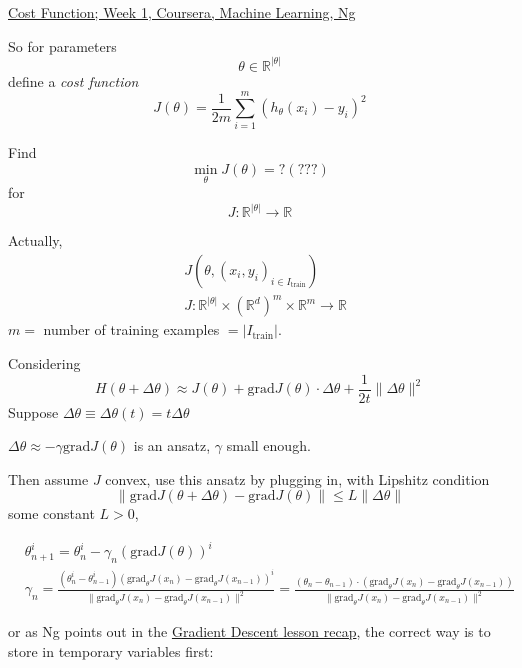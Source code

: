 \documentclass[10pt]{amsart}
\begin{document}
\begin{multicols*}{2}
\href{https://www.coursera.org/learn/machine-learning/lecture/rkTp3/cost-function}{Cost Function; Week 1, Coursera, Machine Learning, Ng}

So for parameters
\[
\theta \in \mathbb{R}^{ |\theta| }
\]
define a \emph{cost function}
\begin{equation}
  J(\theta) = \frac{1}{2 m} \sum_{i=1}^m (h_{\theta}(x_i) - y_i)^2 
\end{equation}

Find
\[
\min_{\theta} J(\theta) = ? (???)
\]
for
\[
J : \mathbb{R}^{ |\theta| } \to \mathbb{R}
\]

Actually,
\begin{equation}
  \begin{aligned}
    & J(\theta, (x_i, y_i)_{i \in I_{\text{train}}} ) \\ 
    & J: \mathbb{R}^{ |\theta|} \times (\mathbb{R}^d)^m \times \mathbb{R}^m \to \mathbb{R}
    \end{aligned}
 \end{equation}
$m=$ number of training examples $= |I_{\text{train}}|$.  

Considering
\[
H(\theta + \Delta \theta ) \approx J(\theta) + \text{grad}J(\theta) \cdot \Delta \theta + \frac{1}{2t} \| \Delta \theta \|^2
\]
Suppose $\Delta \theta \equiv \Delta \theta(t) = t\Delta \theta$

$\Delta \theta \approx - \gamma \text{grad}J(\theta)$ is an ansatz, $\gamma$ small enough.

Then assume $J$ convex, use this ansatz by plugging in, with Lipshitz condition
\[
\| \text{grad}J(\theta + \Delta \theta) - \text{grad}J(\theta) \| \leq L \| \Delta \theta \| 
\]
some constant $L > 0$,

\begin{equation}
\begin{aligned}
  & \theta_{n+1}^i = \theta^i_n - \gamma_n (\text{grad}J(\theta))^i \\ 
 & \gamma_n = \frac{ (\theta^i_n - \theta^i_{n-1} ) (\text{grad}_{\theta}J(x_n) - \text{grad}_{\theta}J(x_{n-1}))^i }{ \| \text{grad}_{\theta} J(x_n) - \text{grad}_{\theta}J(x_{n-1})\|^2 } = \frac{ (\theta_n - \theta_{n-1} )\cdot  (\text{grad}_{\theta}J(x_n) - \text{grad}_{\theta}J(x_{n-1})) }{ \| \text{grad}_{\theta} J(x_n) - \text{grad}_{\theta}J(x_{n-1})\|^2 }
  \end{aligned}
  \end{equation}

or as Ng points out in the \href{https://www.coursera.org/learn/machine-learning/supplement/2GnUg/gradient-descent}{Gradient Descent lesson recap}, the correct way is to store in temporary variables first:


\end{multicols*}
\end{document}

